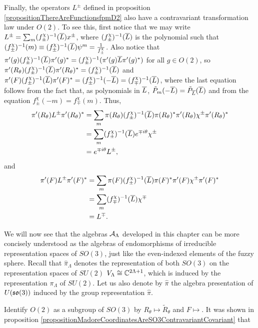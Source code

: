 Finally, the operators $L^\pm$ defined in proposition \ref{propositionThereAreFunctionsfpmD2} also have a contravariant transformation law under $O(2)$. To see this, first notice that we may write $L^\pm = \sum_m (f^\chi_\pm)^{-1}(\overline{L}) x^\pm$, where $(f^\chi_\pm)^{-1}(\overline{L})$ is the polynomial such that $(f^\chi_\pm)^{-1}(m) \equiv (f^\chi_\pm)^{-1}(\overline{L})\psi^m = \frac{1}{f^\chi_\pm}$. Also notice that $\pi'(g) (f^\chi_\pm)^{-1}(\overline{L}) \pi'(g)^* = (f^\chi_\pm)^{-1}(\pi'(g)\overline{L} \pi'(g)^*)$ for all $g \in O(2)$, so $\pi'(R_\theta) (f^\chi_\pm)^{-1}(\overline{L}) \pi'(R_\theta)^* = (f^\chi_\pm)^{-1}(\overline{L})$ and 
$\pi'(F) (f^\chi_\pm)^{-1}(\overline{L}) \pi'(F)^* = (f^\chi_\pm)^{-1}(-\overline{L}) = (f^\chi_\mp)^{-1}(\overline{L})$, where the last equation follows from the fact that, as polynomials in $\overline{L}$, $\tilde P_m(-\overline{L}) = \tilde P_{\overline{L}}(\overline{L})$ and from the equation $f^\chi_\pm(-m) = f^\chi_\mp(m)$. Thus,
\begin{align*}
    \pi'(R_\theta) L^\pm \pi'(R_\theta)^* &= \sum_m \pi(R_\theta)(f^\chi_\pm)^{-1}(\overline{L})\pi(R_\theta)^* \pi'(R_\theta) \chi^\pm \pi'(R_\theta)^*\\
    &= \sum_m (f^\chi_\pm)^{-1}(\overline{L}) e^{\mp i \theta} \chi^\pm\\
    &= e^{\mp i \theta} L^\pm,
\end{align*} and
\begin{align*}
    \pi'(F) L^\pm \pi'(F)^* &= \sum_m \pi(F)(f^\chi_\pm)^{-1}(\overline{L})\pi(F)^* \pi'(F) \chi^\pm \pi'(F)^*\\
    &= \sum_m (f^\chi_\mp)^{-1}(\overline{L}) \chi^\mp\\
    &= L^\mp.
\end{align*}

\lin

We will now see that the algebras $\mathcal A_{\Lambda}$ developed in this chapter can be more concisely understood as the algebras of endomorphisms of irreducible representation spaces of $SO(3)$, just like the even-indexed elements of the fuzzy sphere. Recall that $\hat \pi_\Lambda$ denotes the representation of both $SO(3)$ on the representation spaces of $SU(2)$ $V_{\Lambda} \cong \mathbb{C}^{2\Lambda + 1}$, which is induced by the representation $\pi_\Lambda$ of $SU(2)$. Let us also denote by $\hat \pi$ the algebra presentation of $U(\mathfrak{so}(3))$ induced by the group representation $\hat \pi$.

Identify $O(2)$ as a subgroup of $SO(3)$ by
$R_\theta \mapsto \tilde R_\theta$ and $F \mapsto $. It was shown in proposition \ref{propositionMadoreCoordinatesAreSO3ContravariantCovariant} that 


